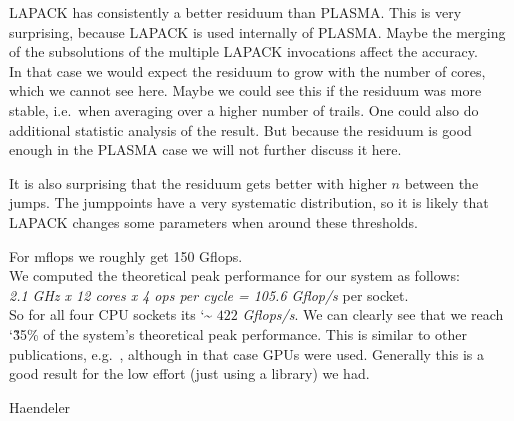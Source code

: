 \documentclass[a4paper,final,ngerman,english]{article}
\begin{document}
LAPACK has consistently a better residuum than PLASMA.\@
This is very surprising, because LAPACK is used internally of PLASMA.\@
Maybe the merging of the subsolutions of the multiple LAPACK invocations affect the accuracy.\\
In that case we would expect the residuum to grow with the number of cores, which we cannot see here.
Maybe we could see this if the residuum was more stable, i.e.\ when averaging over a higher number of trails.
One could also do additional statistic analysis of the result.
But because the residuum is good enough in the PLASMA case we will not further discuss it here.

It is also surprising that the residuum gets better with higher $n$ between the jumps.
The jumppoints have a very systematic distribution, so it is likely that
LAPACK changes some parameters when around these thresholds.

For mflops we roughly get 150 Gflops.\\
We computed the theoretical peak performance for our system as follows:\\
\textit{2.1 GHz x 12 cores x 4 ops per cycle = 105.6 Gflop/s} per socket.~\cite{lawn266} \\
So for all four CPU sockets its \char`\~ $422$ \textit{Gflops/s}.
We can clearly see that we reach \char`\~ 35\% of the system's theoretical peak performance.
This is similar to other publications, e.g.~\cite{lawn266},
although in that case GPUs were used.
Generally this is a good result for the low effort (just using a library) we had.
\begin{flushright} Haendeler \end{flushright} 
%  
\begin{footnotesize}
\end{footnotesize}
\end{document}
